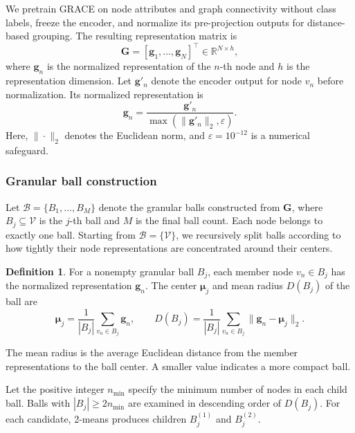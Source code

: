 \documentclass[times,review,10pt]{elsarticle}
\theoremstyle{definition}
\newtheorem{definition}{Definition}
\theoremstyle{plain}
\begin{document}
We pretrain GRACE \cite{ref12} on node attributes and graph connectivity without class labels, freeze the encoder, and normalize its pre-projection outputs for distance-based grouping. The resulting representation matrix is
\begin{equation}\label{eq:2}
\mathbf G=[\mathbf g_1,\ldots,\mathbf g_N]^\top\in\mathbb R^{N\times h},
\end{equation}
where \(\mathbf g_n\) is the normalized representation of the \(n\)-th node and \(h\) is the representation dimension. Let \(\mathbf g'_n\) denote the encoder output for node \(v_n\) before normalization. Its normalized representation is
\begin{equation}\label{eq:3}
\mathbf g_n=\frac{\mathbf g'_n}{\max(\|\mathbf g'_n\|_2,\varepsilon)}.
\end{equation}
Here, \(\|\cdot\|_2\) denotes the Euclidean norm, and \(\varepsilon=10^{-12}\) is a numerical safeguard.



\subsubsection{Granular ball construction}\label{sec:3.2.2}

Let \(\mathcal B=\{B_1,\ldots,B_M\}\) denote the granular balls constructed from \(\mathbf G\), where \(B_j\subseteq\mathcal V\) is the \(j\)-th ball and \(M\) is the final ball count. Each node belongs to exactly one ball. Starting from \(\mathcal B=\{\mathcal V\}\), we recursively split balls according to how tightly their node representations are concentrated around their centers.

\begin{definition}
For a nonempty granular ball \(B_j\), each member node \(v_n\in B_j\) has the normalized representation \(\mathbf g_n\). The center \(\boldsymbol\mu_j\) and mean radius \(D(B_j)\) of the ball are
\begin{equation}\label{eq:4}
\boldsymbol\mu_j=\frac{1}{|B_j|}\sum_{v_n\in B_j}\mathbf g_n,
\qquad D(B_j)=\frac{1}{|B_j|}\sum_{v_n\in B_j}\|\mathbf g_n-\boldsymbol\mu_j\|_2.
\end{equation}
\end{definition}

The mean radius is the average Euclidean distance from the member representations to the ball center. A smaller value indicates a more compact ball.


Let the positive integer \(n_{\min}\) specify the minimum number of nodes in each child ball. Balls with \(|B_j|\geq2n_{\min}\) are examined in descending order of \(D(B_j)\). For each candidate, 2-means produces children \(B_j^{(1)}\) and \(B_j^{(2)}\).
\end{document}
